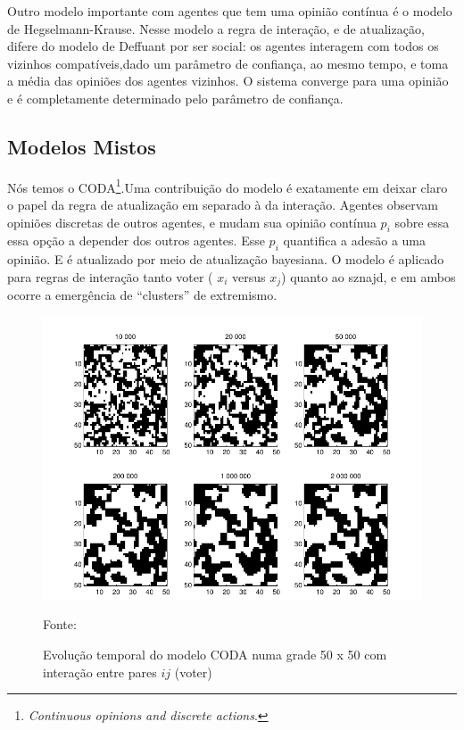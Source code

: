 Outro modelo importante com agentes que tem uma opinião contínua é o modelo de
Hegselmann-Krause. Nesse modelo a regra de interação, e de atualização, difere
do modelo de Deffuant por ser social: os agentes interagem com todos os vizinhos
compatíveis,dado um parâmetro de confiança, ao mesmo tempo, e toma a média das
opiniões dos agentes vizinhos. O sistema converge para uma opinião e é
completamente determinado pelo parâmetro de confiança.




\subsection{Modelos Mistos}

\quad \quad Nós temos o CODA\cite{martins2008continuous}\footnote{\textit{Continuous
    opinions and discrete actions}.}.Uma contribuição do modelo é exatamente em
deixar claro o papel da regra de atualização em separado à da interação. Agentes
observam opiniões discretas de outros agentes, e mudam sua opinião contínua
$p_i$ sobre essa essa opção a depender dos outros agentes. Esse $p_i$ quantifica
a adesão a uma opinião. E é atualizado por meio de atualização bayesiana. O
modelo é aplicado para regras de interação tanto voter ( $x_i $ versus $x_j$)
quanto ao sznajd, e em ambos ocorre a emergência de ``clusters'' de extremismo.

\begin{figure}[H]
  \centering \includegraphics[scale = 0.7]{ims/andre.png}
  \caption{Evolução temporal do modelo CODA numa grade 50 x 50 com
    interação entre pares $ij$ (voter)}
  Fonte: 
\end{figure}


